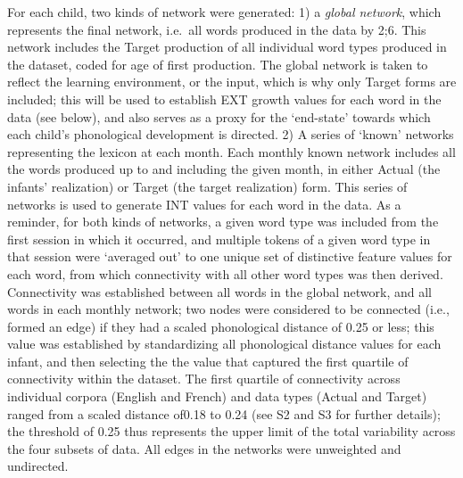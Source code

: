 \documentclass[
  man]{apa6}
\begin{document}
For each child, two kinds of network were generated: 1) a \emph{global network}, which represents the final network, i.e.~all words produced in the data by 2;6. This network includes the Target production of all individual word types produced in the dataset, coded for age of first production. The global network is taken to reflect the learning environment, or the input, which is why only Target forms are included; this will be used to establish EXT growth values for each word in the data (see below), and also serves as a proxy for the `end-state' towards which each child's phonological development is directed. 2) A series of `known' networks representing the lexicon at each month. Each monthly known network includes all the words produced up to and including the given month, in either Actual (the infants' realization) or Target (the target realization) form. This series of networks is used to generate INT values for each word in the data. As a reminder, for both kinds of networks, a given word type was included from the first session in which it occurred, and multiple tokens of a given word type in that session were `averaged out' to one unique set of distinctive feature values for each word, from which connectivity with all other word types was then derived. Connectivity was established between all words in the global network, and all words in each monthly network; two nodes were considered to be connected (i.e., formed an edge) if they had a scaled phonological distance of 0.25 or less; this value was established by standardizing all phonological distance values for each infant, and then selecting the the value that captured the first quartile of connectivity within the dataset. The first quartile of connectivity across individual corpora (English and French) and data types (Actual and Target) ranged from a scaled distance of0.18 to 0.24 (see S2 and S3 for further details); the threshold of 0.25 thus represents the upper limit of the total variability across the four subsets of data. All edges in the networks were unweighted and undirected.
\end{document}
